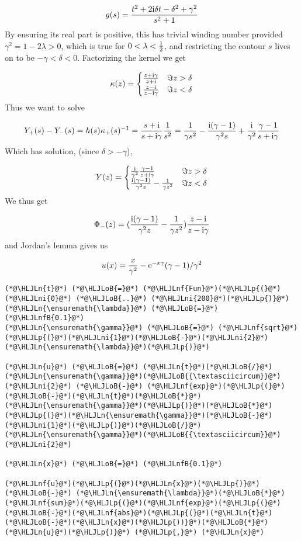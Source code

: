 \documentclass[12pt,a4paper]{article}
\newcommand{\HLJLn}[1]{#1}
\newcommand{\HLJLnf}[1]{\textcolor[RGB]{66,102,213}{#1}}
\newcommand{\HLJLnfB}[1]{\textcolor[RGB]{59,151,46}{#1}}
\newcommand{\HLJLni}[1]{\textcolor[RGB]{59,151,46}{#1}}
\newcommand{\HLJLoB}[1]{\textcolor[RGB]{102,102,102}{\textbf{#1}}}
\newcommand{\HLJLp}[1]{#1}
\def\I{ {\rm i} }
\def\E{ {\rm e} }
\begin{document}
\[
g(s) =  {t^2 +2 \I \delta t -\delta^2 +\gamma^2 \over s^2 + 1}
\]
By ensuring its real part is positive, this has trivial winding number provided $\gamma^2 = 1 - 2\lambda > 0$, which is true for $0 < \lambda < {1 \over 2}$, and restricting the contour $s$ lives on to be $- {\gamma} < \delta < 0$. Factorizing the kernel we get

\[
\kappa(z) = \begin{cases}
    {z+\I  \gamma \over z + \I} & \Im z > \delta\\
    {z-\I  \over z-\I  \gamma} & \Im z < \delta
    \end{cases}
\]
Thus we want to solve

\[
Y_+(s) - Y_-(s) = h(s) \kappa_+(s)^{-1} = {s + \I \over s + \I  \gamma} { 1 \over s^2} = {1 \over \gamma s^2} - {\I ( \gamma - 1) \over \gamma^2 s} + {\I \over \gamma^2 }{  \gamma - 1 \over s+ \I  \gamma}
\]
Which has solution, (since $\delta > - \gamma$),

\[
Y(z) = \begin{cases}
   {\I \over \gamma^2 }{  \gamma - 1 \over z+ \I \gamma} & \Im z > \delta\\
 {\I ( \gamma - 1) \over \gamma^2 z} - {1 \over \gamma z^2} & \Im z < \delta
    \end{cases}
\]
We thus get

\[
\Phi_-(z) = ({\I ( \gamma - 1) \over \gamma^2 z} - {1 \over \gamma z^2})     {z-\I  \over z-\I  \gamma}
\]
and Jordan's lemma gives us

\[
u(x) = {x \over \gamma^2} - \E^{-x \gamma}(\gamma-1)/\gamma^2
\]

\begin{lstlisting}
(*@\HLJLn{t}@*) (*@\HLJLoB{=}@*) (*@\HLJLnf{Fun}@*)(*@\HLJLp{(}@*)(*@\HLJLni{0}@*) (*@\HLJLoB{..}@*) (*@\HLJLni{200}@*)(*@\HLJLp{)}@*)
(*@\HLJLn{\ensuremath{\lambda}}@*) (*@\HLJLoB{=}@*) (*@\HLJLnfB{0.1}@*)
(*@\HLJLn{\ensuremath{\gamma}}@*) (*@\HLJLoB{=}@*) (*@\HLJLnf{sqrt}@*)(*@\HLJLp{(}@*)(*@\HLJLni{1}@*)(*@\HLJLoB{-}@*)(*@\HLJLni{2}@*)(*@\HLJLn{\ensuremath{\lambda}}@*)(*@\HLJLp{)}@*)

(*@\HLJLn{u}@*) (*@\HLJLoB{=}@*) (*@\HLJLn{t}@*)(*@\HLJLoB{/}@*)(*@\HLJLn{\ensuremath{\gamma}}@*)(*@\HLJLoB{{\textasciicircum}}@*)(*@\HLJLni{2}@*) (*@\HLJLoB{-}@*) (*@\HLJLnf{exp}@*)(*@\HLJLp{(}@*)(*@\HLJLoB{-}@*)(*@\HLJLn{t}@*)(*@\HLJLoB{*}@*)(*@\HLJLn{\ensuremath{\gamma}}@*)(*@\HLJLp{)}@*)(*@\HLJLoB{*}@*)(*@\HLJLp{(}@*)(*@\HLJLn{\ensuremath{\gamma}}@*)(*@\HLJLoB{-}@*)(*@\HLJLni{1}@*)(*@\HLJLp{)}@*)(*@\HLJLoB{/}@*)(*@\HLJLn{\ensuremath{\gamma}}@*)(*@\HLJLoB{{\textasciicircum}}@*)(*@\HLJLni{2}@*)

(*@\HLJLn{x}@*) (*@\HLJLoB{=}@*) (*@\HLJLnfB{0.1}@*)

(*@\HLJLnf{u}@*)(*@\HLJLp{(}@*)(*@\HLJLn{x}@*)(*@\HLJLp{)}@*) (*@\HLJLoB{-}@*) (*@\HLJLn{\ensuremath{\lambda}}@*)(*@\HLJLoB{*}@*)(*@\HLJLnf{sum}@*)(*@\HLJLp{(}@*)(*@\HLJLnf{exp}@*)(*@\HLJLp{(}@*)(*@\HLJLoB{-}@*)(*@\HLJLnf{abs}@*)(*@\HLJLp{(}@*)(*@\HLJLn{t}@*)(*@\HLJLoB{-}@*)(*@\HLJLn{x}@*)(*@\HLJLp{))}@*)(*@\HLJLoB{*}@*)(*@\HLJLn{u}@*)(*@\HLJLp{)}@*) (*@\HLJLp{,}@*) (*@\HLJLn{x}@*)
\end{lstlisting}
\end{document}
